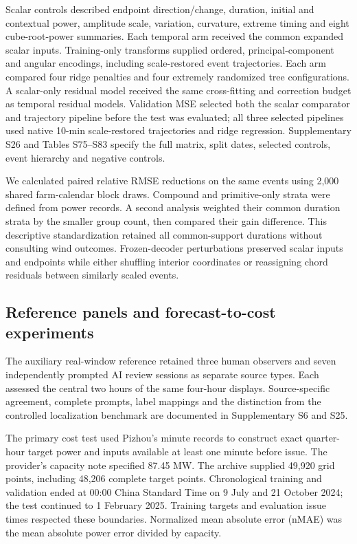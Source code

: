 \documentclass[preprint,12pt]{elsarticle}
\begin{document}
Scalar controls described endpoint direction/change, duration, initial and contextual power, amplitude scale, variation, curvature, extreme timing and eight cube-root-power summaries. Each temporal arm received the common expanded scalar inputs. Training-only transforms supplied ordered, principal-component and angular encodings, including scale-restored event trajectories. Each arm compared four ridge penalties and four extremely randomized tree configurations. A scalar-only residual model received the same cross-fitting and correction budget as temporal residual models. Validation MSE selected both the scalar comparator and trajectory pipeline before the test was evaluated; all three selected pipelines used native 10-min scale-restored trajectories and ridge regression. Supplementary S26 and Tables S75--S83 specify the full matrix, split dates, selected controls, event hierarchy and negative controls.

We calculated paired relative RMSE reductions on the same events using 2,000 shared farm-calendar block draws. Compound and primitive-only strata were defined from power records. A second analysis weighted their common duration strata by the smaller group count, then compared their gain difference. This descriptive standardization retained all common-support durations without consulting wind outcomes. Frozen-decoder perturbations preserved scalar inputs and endpoints while either shuffling interior coordinates or reassigning chord residuals between similarly scaled events.

\subsection{Reference panels and forecast-to-cost experiments}\label{reference-panels-and-forecast-to-cost-experiments}

The auxiliary real-window reference retained three human observers and seven independently prompted AI review sessions as separate source types. Each assessed the central two hours of the same four-hour displays. Source-specific agreement, complete prompts, label mappings and the distinction from the controlled localization benchmark are documented in Supplementary S6 and S25.

The primary cost test used Pizhou's minute records to construct exact quarter-hour target power and inputs available at least one minute before issue. The provider's capacity note specified 87.45 MW. The archive supplied 49,920 grid points, including 48,206 complete target points. Chronological training and validation ended at 00:00 China Standard Time on 9 July and 21 October 2024; the test continued to 1 February 2025. Training targets and evaluation issue times respected these boundaries. Normalized mean absolute error (nMAE) was the mean absolute power error divided by capacity.
\end{document}
